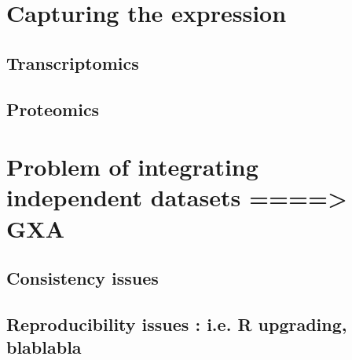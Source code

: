 \section{Capturing the expression}
\subsection{Transcriptomics}
\subsection{Proteomics}

\section{Problem of integrating independent datasets ====> GXA}

\subsection{Consistency issues}

\subsection{Reproducibility issues : i.e. R upgrading, blablabla}

